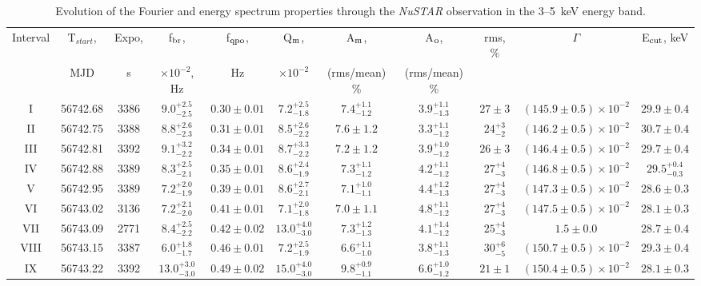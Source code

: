 \documentclass[a4paper,fleqn,usenatbib]{mnras}
\begin{document}
\begin{table}
\noindent
\centering
\caption{Evolution of the Fourier and energy spectrum properties through the {\it NuSTAR} observation in the 3--5~keV energy band.}
\label{tab:timing}
\centering
\begin{tabular}{|c|c|c|c|c|c|c|c|c|c|c|}
\hline\hline
Interval & T$_{start}$, & Expo,  & f$_{\rm br}$, & f$_{\rm qpo}$, & Q$_{\rm m}$, & A$_{\rm m}$, & A$_{\rm o}$,& rms, \% & $\Gamma$ & E$_{\rm cut}$, keV \\
            &  MJD &  s & $\times10^{-2}$, Hz &  Hz & $\times10^{-2}$ & (rms/mean) \% &  (rms/mean) \%   &  & & \\
\hline
I &  	56742.68 & 3386 & $9.0_{-2.5}^{+2.5}$ & $0.30\pm0.01$ & $7.2_{-1.8}^{+2.5}$ & $7.4_{-1.2}^{+1.1}$ & $3.9_{-1.3}^{+1.1}$ & $27\pm3$ & $(145.9\pm0.5)\times10^{-2}$ & $29.9\pm0.4$ \\
II & 56742.75 & 3388 & $8.8_{-2.3}^{+2.6}$ & $0.31\pm0.01$ & $8.5_{-2.2}^{+2.6}$ & $7.6\pm1.2$ & $3.3_{-1.2}^{+1.1}$ & $24_{-2}^{+3}$ & $(146.2\pm0.5)\times10^{-2}$ & $30.7\pm0.4$ \\
III &  56742.81 & 3392 & $9.1_{-2.2}^{+3.2}$ & $0.34\pm0.01$ & $8.7_{-2.2}^{+3.3}$ & $7.2\pm1.2$ & $3.9_{-1.2}^{+1.0}$ & $26\pm3$ & $(146.4\pm0.5)\times10^{-2}$ & $29.7\pm0.4$ \\
IV &  56742.88 & 3389 & $8.3_{-2.1}^{+2.5}$ & $0.35\pm0.01$ & $8.6_{-1.9}^{+2.4}$ & $7.3_{-1.2}^{+1.1}$ & $4.2_{-1.2}^{+1.1}$ & $27_{-3}^{+4}$ & $(146.8\pm0.5)\times10^{-2}$ & $29.5_{-0.3}^{+0.4}$ \\
V &  56742.95 & 3389 & $7.2_{-1.9}^{+2.0}$ & $0.39\pm0.01$ & $8.6_{-2.1}^{+2.7}$ & $7.1_{-1.1}^{+1.0}$ & $4.4_{-1.3}^{+1.2}$ & $27_{-3}^{+4}$ & $(147.3\pm0.5)\times10^{-2}$ & $28.6\pm0.3$ \\
VI &  56743.02 & 3136 & $7.2_{-2.0}^{+2.1}$ & $0.41\pm0.01$ & $7.1_{-1.8}^{+2.0}$ & $7.0\pm1.1$ & $4.8_{-1.2}^{+1.1}$ & $27_{-3}^{+4}$ & $(147.5\pm0.5)\times10^{-2}$ & $28.1\pm0.3$ \\
VII & 56743.09 & 2771 & $8.4_{-2.2}^{+2.5}$ & $0.42\pm0.02$ & $13.0_{-3.0}^{+4.0}$ & $7.3_{-1.3}^{+1.2}$ & $4.1_{-1.2}^{+1.4}$ & $25_{-3}^{+4}$ & $1.5\pm0.0$ & $28.7\pm0.4$ \\
VIII & 56743.15 & 3387 & $6.0_{-1.7}^{+1.8}$ & $0.46\pm0.01$ & $7.2_{-1.9}^{+2.5}$ & $6.6_{-1.0}^{+1.1}$ & $3.8_{-1.3}^{+1.1}$ & $30_{-5}^{+6}$ & $(150.7\pm0.5)\times10^{-2}$ & $29.3\pm0.4$ \\
IX & 56743.22 & 3392 & $13.0_{-3.0}^{+3.0}$ & $0.49\pm0.02$ & $15.0_{-3.0}^{+4.0}$ & $9.8_{-1.1}^{+0.9}$ & $6.6_{-1.2}^{+1.0}$ & $21\pm1$ & $(150.4\pm0.5)\times10^{-2}$ & $28.1\pm0.3$ \\

\end{tabular}
\end{table}
\end{document}
